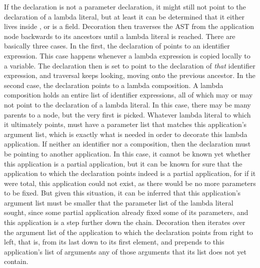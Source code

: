 If the  declaration is not a parameter declaration, it might still not point to the declaration of a lambda literal, but at least it can be determined that it either lives inside , or is a field. Decoration then traverses the AST from the application node backwards to its ancestors until a lambda literal is reached. There are basically three cases. In the first, the declaration of  points to an identifier expression. This case happens whenever a lambda expression is copied locally to a variable. The declaration then is set to point to the declaration of \emph{that} identifier expression, and traversal keeps looking, moving onto the previous ancestor. In the second case, the declaration points to a lambda composition. A lambda composition holds an entire list of identifier expressions, all of which may or may not point to the declaration of a lambda literal. In this case, there may be many parents to a node, but the very first is picked. Whatever lambda literal to which it ultimately points, must have a parameter list that matches this application's argument list, which is exactly what is needed in order to decorate this lambda application. If neither an identifier nor a composition, then the declaration must be pointing to another application. In this case, it cannot be known yet whether this application is a partial application, but it can be known for sure that the application to which the declaration points indeed is a partial application, for if it were total, this application could not exist, as there would be no more parameters to be fixed. But given this situation, it can be inferred that this application's argument list must be smaller that the parameter list of the lambda literal sought, since some partial application already fixed some of its parameters, and this application is a step further down the chain. Decoration then iterates over the argument list of the application to which the declaration points from right to left, that is, from its last down to its first element, and prepends to this application's list of arguments any of those arguments that its list does not yet contain.

